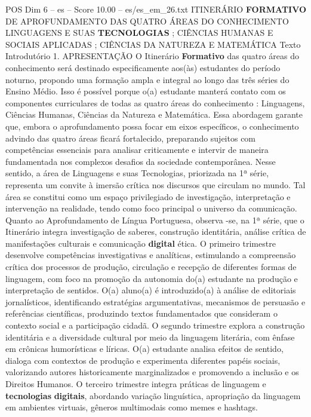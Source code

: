 \begin{textsample}{POS Dim 6 – es – Score 10.00 – es/es\_em\_26.txt}  \label{ex:f6_pos_143}
ITINERÁRIO \textbf{FORMATIVO} DE APROFUNDAMENTO DAS QUATRO ÁREAS DO CONHECIMENTO LINGUAGENS E SUAS \textbf{TECNOLOGIAS} ; CIÊNCIAS HUMANAS E SOCIAIS APLICADAS ; CIÊNCIAS DA NATUREZA E MATEMÁTICA Texto Introdutório 1.
APRESENTAÇÃO O Itinerário \textbf{Formativo} das quatro áreas do conhecimento será destinado especificamente aos(às) estudantes do período noturno, propondo uma formação ampla e integral ao longo das três séries do Ensino Médio.
Isso é possível porque o(a) estudante manterá contato com os componentes curriculares de todas as quatro áreas do conhecimento : Linguagens, Ciências Humanas, Ciências da Natureza e Matemática.
Essa abordagem garante que, embora o aprofundamento possa focar em eixos específicos, o conhecimento advindo das quatro áreas ficará fortalecido, preparando sujeitos com competências essenciais para analisar criticamente e intervir de maneira fundamentada nos complexos desafios da sociedade contemporânea.
Nesse sentido, a área de Linguagens e suas Tecnologias, priorizada na 1ª série, representa um convite à imersão crítica nos discursos que circulam no mundo.
Tal área se constitui como um espaço privilegiado de investigação, interpretação e intervenção na realidade, tendo como foco principal o universo da comunicação.
Quanto ao Aprofundamento de Língua Portuguesa, observa -se, na 1ª série, que o Itinerário integra investigação de saberes, construção identitária, análise crítica de manifestações culturais e comunicação \textbf{digital} ética.
O primeiro trimestre desenvolve competências investigativas e analíticas, estimulando a compreensão crítica dos processos de produção, circulação e recepção de diferentes formas de linguagem, com foco na promoção da autonomia do(a) estudante na produção e interpretação de sentidos.
O(a) aluno(a) é introduzido(a) à análise de editoriais jornalísticos, identificando estratégias argumentativas, mecanismos de persuasão e referências científicas, produzindo textos fundamentados que consideram o contexto social e a participação cidadã.
O segundo trimestre explora a construção identitária e a diversidade cultural por meio da linguagem literária, com ênfase em crônicas humorísticas e líricas.
O(a) estudante analisa efeitos de sentido, dialoga com contextos de produção e experimenta diferentes papéis sociais, valorizando autores historicamente marginalizados e promovendo a inclusão e os Direitos Humanos.
O terceiro trimestre integra práticas de linguagem e \textbf{tecnologias} \textbf{digitais}, abordando variação linguística, apropriação da linguagem em ambientes virtuais, gêneros multimodais como memes e hashtags.

\end{textsample}
